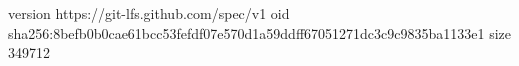 version https://git-lfs.github.com/spec/v1
oid sha256:8befb0b0cae61bcc53fefdf07e570d1a59ddff67051271dc3c9c9835ba1133e1
size 349712
